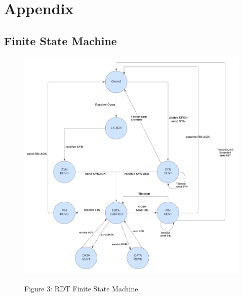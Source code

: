 \appendix{}
\section{Appendix}

\subsection{Finite State Machine}

\begin{figure}[H]
\begin{center}
\includegraphics[width=170mm]{images/fsm.png}
\end{center}
\begin{center}
    Figure 3: RDT Finite State Machine
\end{center}
\end{figure}


